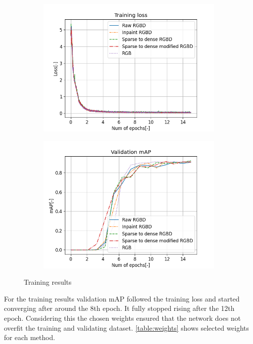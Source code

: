 \documentclass[twoside]{ctuthesis}
\theoremstyle{plain}
\theoremstyle{definition}
\theoremstyle{note}
\begin{document}
\begin{figure}
	\centering
	\begin{subfigure}[b]{0.49\textwidth}
		\centering
		\includegraphics[width=\textwidth]{train_loss.png}
	\end{subfigure}
	\hfill
	\begin{subfigure}[b]{0.49\textwidth}
		\centering
		\includegraphics[width=\textwidth]{validation_mAP.png}
	\end{subfigure}
	\caption{Training results}
\end{figure}
For the training results validation mAP followed the training loss and started converging after around the 8th epoch. It fully stopped rising after the 12th epoch. Considering this the chosen weights ensured that the network does not overfit the training and validating dataset. \autoref{table:weights} shows selected weights for each method.
\end{document}
